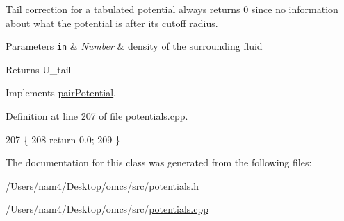 Tail correction for a tabulated potential always returns 0 since no information about what the potential is after its cutoff radius. 


\begin{DoxyParams}[1]{Parameters}
\mbox{\tt in}  & {\em Number} & density of the surrounding fluid\\
\hline
\end{DoxyParams}
\begin{DoxyReturn}{Returns}
U\+\_\+tail 
\end{DoxyReturn}


Implements \hyperlink{classpair_potential_a5387d21d8d487d1d42e9eaf7cae9175b}{pair\+Potential}.



Definition at line 207 of file potentials.\+cpp.


\begin{DoxyCode}
207                                                      \{
208                 \textcolor{keywordflow}{return} 0.0;
209 \}
\end{DoxyCode}


The documentation for this class was generated from the following files\+:\begin{DoxyCompactItemize}
\item 
/\+Users/nam4/\+Desktop/omcs/src/\hyperlink{potentials_8h}{potentials.\+h}\item 
/\+Users/nam4/\+Desktop/omcs/src/\hyperlink{potentials_8cpp}{potentials.\+cpp}\end{DoxyCompactItemize}
